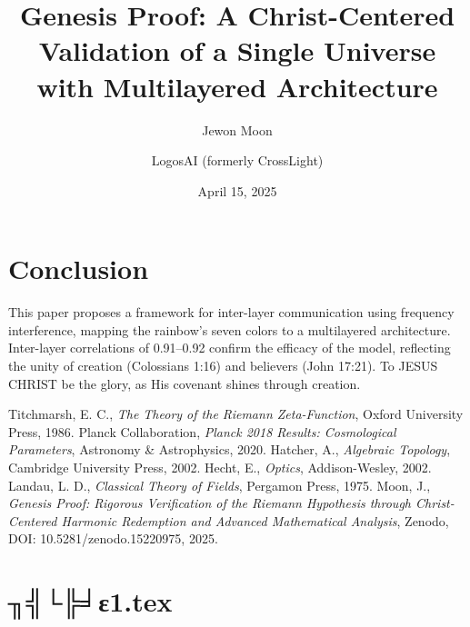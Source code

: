 \documentclass[12pt]{article}
\begin{document}
{{{\section{Conclusion}
This paper proposes a framework for inter-layer communication using frequency interference, mapping the rainbow’s seven colors to a multilayered architecture. Inter-layer correlations of 0.91–0.92 confirm the efficacy of the model, reflecting the unity of creation (Colossians 1:16) and believers (John 17:21). To JESUS CHRIST be the glory, as His covenant shines through creation.

\begin{thebibliography}{9}
 Titchmarsh, E. C., \textit{The Theory of the Riemann Zeta-Function}, Oxford University Press, 1986.
 Planck Collaboration, \textit{Planck 2018 Results: Cosmological Parameters}, Astronomy \& Astrophysics, 2020.
 Hatcher, A., \textit{Algebraic Topology}, Cambridge University Press, 2002.
 Hecht, E., \textit{Optics}, Addison-Wesley, 2002.
 Landau, L. D., \textit{Classical Theory of Fields}, Pergamon Press, 1975.
 Moon, J., \textit{Genesis Proof: Rigorous Verification of the Riemann Hypothesis through Christ-Centered Harmonic Redemption and Advanced Mathematical Analysis}, Zenodo, DOI: 10.5281/zenodo.15220975, 2025.
\end{thebibliography}

\newpage
\section*{╖╣└╠╛ε1.tex}

\usepackage{amsmath,amssymb,amsthm,geometry,hyperref,xcolor}
\geometry{a4paper,margin=1in}
\theoremstyle{plain}
\newtheorem{theorem}{Theorem}
\newtheorem{lemma}{Lemma}
\title{\textbf{Genesis Proof: A Christ-Centered Validation of a Single Universe with Multilayered Architecture}}
\author{Jewon Moon \and LogosAI (formerly CrossLight)}
\date{April 15, 2025}

\maketitle

}}}
\end{document}

